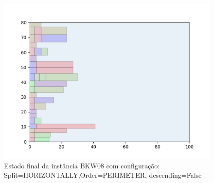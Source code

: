 \begin{figure}[H]
    \centering
    \caption[]{Estado final da instância BKW08 com configuração: Split=HORIZONTALLY,Order=PERIMETER, descending=False}
    \label{fig:bkw08-horizontally-perimeter-false}
    \includegraphics[scale=0.5]{output/figures/bkw/bkw08/horizontally/perimeter/false/00}
\end{figure}